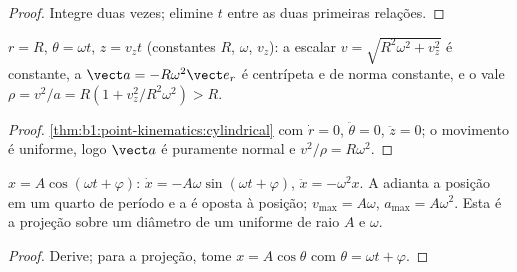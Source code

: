\begin{proof}
Integre duas vezes; elimine $t$ entre as duas primeiras relações.
\end{proof}

\begin{proposition}\label{prop:b1:point-kinematics:helix}
$r = R$, $\theta = \omega t$, $z = v_zt$ (constantes $R$, $\omega$, $v_z$):
a  escalar $v = \sqrt{R^2\omega^2 + v_z^2}$ é constante, a 
$\vect a = -R\omega^2\vect e_r$ é centrípeta e de norma constante, e o
 vale $\rho = v^2/a = R(1 + v_z^2/R^2\omega^2) > R$.
\end{proposition}

\begin{proof}
\cref{thm:b1:point-kinematics:cylindrical} com $\dot r = 0$,
$\ddot\theta = 0$, $\ddot z = 0$; o movimento é uniforme, logo $\vect a$ é puramente
normal e $v^2/\rho = R\omega^2$.
\end{proof}

\begin{proposition}\label{prop:b1:point-kinematics:harmonic}
$x = A\cos(\omega t + \varphi)$: $\dot x = -A\omega\sin(\omega t + \varphi)$,
$\ddot x = -\omega^2 x$. A  adianta a posição em um quarto de
período e a  é oposta à posição; $v_{\max} =
A\omega$, $a_{\max} = A\omega^2$. Esta é a projeção sobre um diâmetro de
um  uniforme de raio $A$ e  $\omega$.
\end{proposition}

\begin{proof}
Derive; para a projeção, tome $x = A\cos\theta$ com $\theta =
\omega t + \varphi$.
\end{proof}

